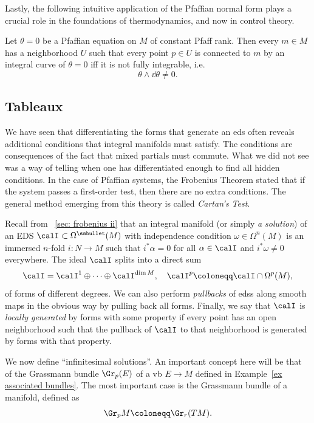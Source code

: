 Lastly, the following intuitive application of the Pfaffian normal form plays a crucial role in the foundations of thermodynamics, and now in control theory.

\begin{thm}[Caratheodory]
    Let $\theta=0$ be a Pfaffian equation on $M$ of constant Pfaff rank. Then every $m\in M$ has a neighborhood $U$ such that every point $p\in U$ is connected to $m$ by an integral curve of $\theta=0$ iff it is not fully integrable, i.e.\
    \[\theta\wedge\dd\theta\neq 0.\]
\end{thm}








\subsection{Tableaux}


We have seen that differentiating the forms that generate an \gls{eds} often reveals additional conditions that integral manifolds must satisfy. The conditions are consequences of the fact that mixed partials must commute. What we did not see was a way of telling when one has differentiated enough to find all hidden conditions. In the case of Pfaffian systems, the Frobenius Theorem stated that if the system passes a first-order test, then there are no extra conditions. The general method emerging from this theory is called \emph{Cartan's Test}.

Recall from \sect~\ref{sec: frobenius ii} that an integral manifold (or simply \emph{a solution}) of an EDS $\calI\subset\Omega^{\smbullet }(M)$ with independence condition $\omega\in\Omega^n(M)$ is an immersed $n$-fold  $i:N\to M$ such that $i^\ast\alpha=0$ for all $\alpha\in \calI$ and $i^\ast \omega\neq 0$ everywhere. The ideal $\calI$ splits into a direct sum 
\[\calI=\calI^1\oplus\cdots\oplus \calI^{\dim M},\quad \calI^p\coloneqq \calI\cap \Omega^p(M),\]
of forms of different degrees. We can also perform \emph{pullbacks} of \glspl{eds} along smooth maps in the obvious way by pulling back all forms. Finally, we say that $\calI$ is \emph{locally generated} by forms with some property if every point has an open neighborhood such that the pullback of $\calI$ to that neighborhood is generated by forms with that property.

We now define ``infinitesimal solutions''. An important concept here will be that of the Grassmann bundle $\Gr_p(E)$ of a \gls{vb} $E\to M$ defined in Example~\ref{ex associated bundles}. The most important case is the Grassmann bundle of a manifold, defined as
\[\Gr_p M\coloneqq \Gr_r(TM).\]

